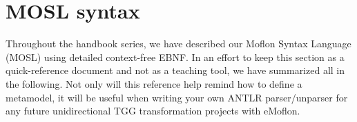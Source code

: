 \newpage
\section{MOSL syntax}
\texHeader

Throughout the handbook series, we have described our Moflon Syntax Language (MOSL) using detailed context-free EBNF. In an effort to keep this section as a
quick-reference document and not as a teaching tool, we have summarized all in the following. Not only will this reference help remind how to define a
metamodel, it will be useful when writing your own ANTLR parser/unparser for any future unidirectional TGG transformation projects with
eMoflon.
